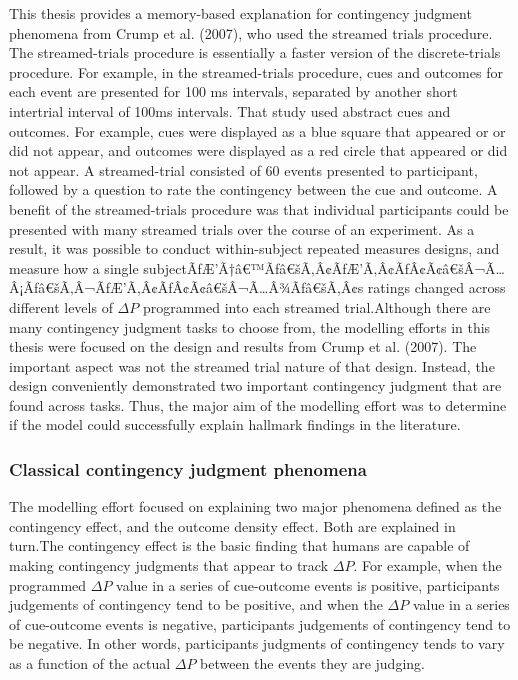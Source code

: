\documentclass[
  english,
  man,floatsintext]{apa6}
\begin{document}
This thesis provides a memory-based explanation for contingency judgment phenomena from Crump et al. (2007), who used the streamed trials procedure. The streamed-trials procedure is essentially a faster version of the discrete-trials procedure. For example, in the streamed-trials procedure, cues and outcomes for each event are presented for 100 ms intervals, separated by another short intertrial interval of 100ms intervals. That study used abstract cues and outcomes. For example, cues were displayed as a blue square that appeared or or did not appear, and outcomes were displayed as a red circle that appeared or did not appear. A streamed-trial consisted of 60 events presented to participant, followed by a question to rate the contingency between the cue and outcome. A benefit of the streamed-trials procedure was that individual participants could be presented with many streamed trials over the course of an experiment. As a result, it was possible to conduct within-subject repeated measures designs, and measure how a single subjectÃƒÆ'Ã†â€™Ãƒâ€šÃ‚Â¢ÃƒÆ'Ã‚Â¢ÃƒÂ¢Ã¢â€šÂ¬Ã\ldots Â¡Ãƒâ€šÃ‚Â¬ÃƒÆ'Ã‚Â¢ÃƒÂ¢Ã¢â€šÂ¬Ã\ldots Â¾Ãƒâ€šÃ‚Â¢s ratings changed across different levels of \(\Delta P\) programmed into each streamed trial.Although there are many contingency judgment tasks to choose from, the modelling efforts in this thesis were focused on the design and results from Crump et al. (2007). The important aspect was not the streamed trial nature of that design. Instead, the design conveniently demonstrated two important contingency judgment that are found across tasks. Thus, the major aim of the modelling effort was to determine if the model could successfully explain hallmark findings in the literature.

\hypertarget{classical-contingency-judgment-phenomena}{%
\subsubsection{Classical contingency judgment phenomena}\label{classical-contingency-judgment-phenomena}}

The modelling effort focused on explaining two major phenomena defined as the contingency effect, and the outcome density effect. Both are explained in turn.The contingency effect is the basic finding that humans are capable of making contingency judgments that appear to track \(\Delta P\). For example, when the programmed \(\Delta P\) value in a series of cue-outcome events is positive, participants judgements of contingency tend to be positive, and when the \(\Delta P\) value in a series of cue-outcome events is negative, participants judgements of contingency tend to be negative. In other words, participants judgments of contingency tends to vary as a function of the actual \(\Delta P\) between the events they are judging.
\end{document}
